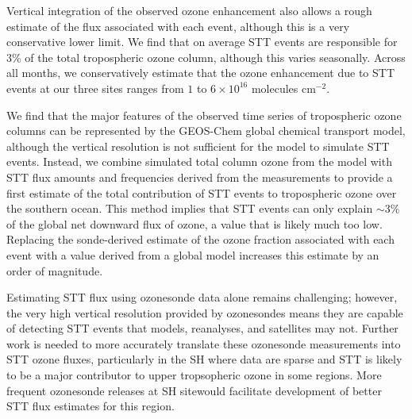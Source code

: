 \documentclass{article}
\begin{document}
  
  Vertical integration of the observed ozone enhancement also allows a rough estimate of the flux associated with each event, although this is a very conservative lower limit.
  We find that on average STT events are responsible for 3\% of the total tropospheric ozone column, although this varies seasonally.
  Across all months, we conservatively estimate that the ozone enhancement due to STT events at our three sites ranges from $1$ to $6 \times 10^{16}$ molecules cm$^{-2}$.
  

  We find that the major features of the observed time series of tropospheric ozone columns can be represented by the GEOS-Chem global chemical transport model, although the vertical resolution is not sufficient for the model to simulate STT events. 
  Instead, we combine simulated total column ozone from the model with STT flux amounts and frequencies derived from the measurements to provide a first estimate of the total contribution of STT events to tropospheric ozone over the southern ocean.
  This method implies that STT events can only explain $\sim$3\% of the global net downward flux of ozone, a value that is likely much too low. 
  Replacing the sonde-derived estimate of the ozone fraction associated with each event with a value derived from a global model \citep{Terao2008} increases this estimate by an order of magnitude.

  Estimating STT flux using ozonesonde data alone remains challenging; however, the very high vertical resolution provided by ozonesondes means they are capable of detecting STT events that models, reanalyses, and satellites may not. 
  Further work is needed to more accurately translate these ozonesonde measurements into STT ozone fluxes, particularly in the SH where data are sparse and STT is likely to be a major contributor to upper tropsopheric ozone in some regions.
  More frequent ozonesonde releases at SH sitewould facilitate development of better STT flux estimates for this region.

  
  

  

\end{document}
